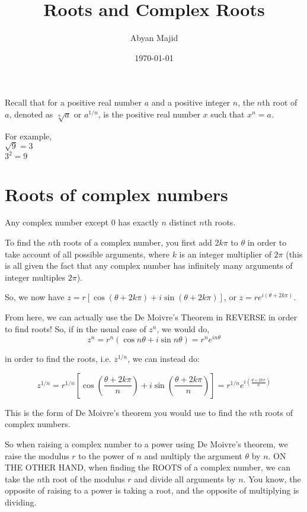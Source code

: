 \documentclass{article}
\begin{document}
\title{Roots and Complex Roots}
\author{Abyan Majid}
\date{\today}
\maketitle

\noindent Recall that for a positive real number $a$ and a positive integer $n$, the $n$th root of $a$, denoted as $\sqrt[n]{a}$ or $a^{1/n}$, is the positive real number $x$ such that $x^n=a$.

\vspace{\baselineskip}

\noindent For example, \\ $\sqrt{9}=3$ \\ $3^2=9$

\section{Roots of complex numbers}

\begin{center}
    Any complex number except 0 has exactly $n$ distinct $n$th roots.
\end{center}
To find the $n$th roots of a complex number, you first add $2k\pi$ to $\theta$ in order to take account of all possible arguments, where $k$ is an integer multiplier of $2\pi$ (this is all given the fact that any complex number has infinitely many arguments of integer multiples $2\pi$).

\begin{center}
    So, we now have $z=r[\cos(\theta+2k\pi)+i\sin(\theta+2k\pi)]$, or $z=re^{i(\theta+2k\pi)}$.
\end{center}

\noindent From here, we can actually use the De Moivre's Theorem in REVERSE in order to find roots! So, if in the usual case of $z^n$, we would do,
$$z^n=r^n(\cos n\theta + i\sin n\theta) = r^ne^{in\theta}$$

\noindent in order to find the roots, i.e. $z^{1/n}$, we can instead do:

$$z^{1/n}=r^{1/n}[\cos(\frac{\theta+2k\pi}{n})+i\sin(\frac{\theta+2k\pi}{n})] = r^{1/n}e^{i(\frac{\theta+2k\pi}{n})}$$

\begin{center}
    This is the form of De Moivre's theorem you would use to find the $n$th roots of complex numbers.
\end{center}

\noindent So when raising a complex number to a power using De Moivre's theorem, we raise the modulus $r$ to the power of $n$ and multiply the argument $\theta$ by $n$. ON THE OTHER HAND, when finding the ROOTS of a complex number, we can take the $n$th root of the modulus $r$ and divide all arguments by $n$. You know, the opposite of raising to a power is taking a root, and the opposite of multiplying is dividing. 
\end{document}
